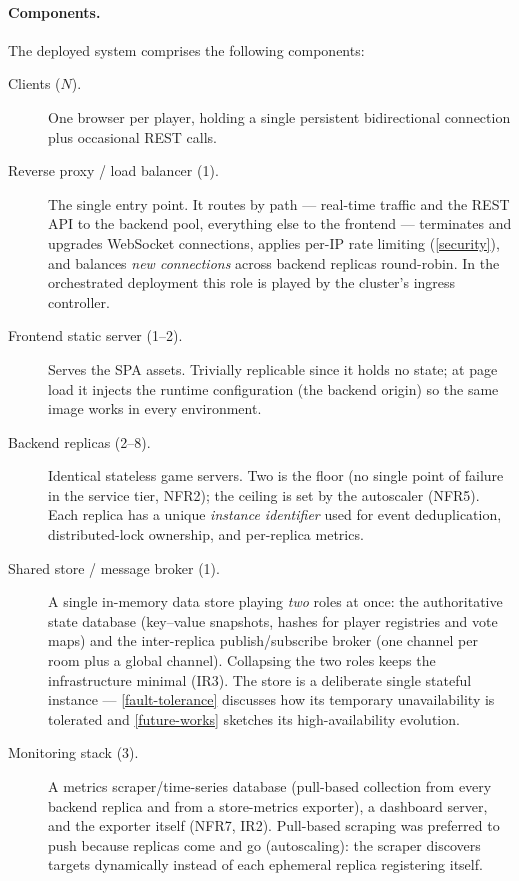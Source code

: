 \documentclass{scrartcl}
\begin{document}
\paragraph{Components.}
The deployed system comprises the following components:
\begin{description}
      \item[Clients ($N$).] One browser per player, holding a single persistent
            bidirectional connection plus occasional REST calls.
      \item[Reverse proxy / load balancer (1).] The single entry point. It routes by
            path --- real-time traffic and the REST API to the backend pool, everything
            else to the frontend --- terminates and upgrades WebSocket connections, applies
            per-IP rate limiting (\cref{security}), and balances \emph{new connections}
            across backend replicas round-robin. In the orchestrated deployment this role
            is played by the cluster's ingress controller.
      \item[Frontend static server (1--2).] Serves the SPA assets. Trivially
            replicable since it holds no state; at page load it injects the runtime
            configuration (the backend origin) so the same image works in every
            environment.
      \item[Backend replicas (2--8).] Identical stateless game servers. Two is the
            floor (no single point of failure in the service tier, NFR2); the ceiling is
            set by the autoscaler (NFR5). Each replica has a unique \emph{instance
                  identifier} used for event deduplication, distributed-lock ownership, and
            per-replica metrics.
      \item[Shared store / message broker (1).] A single in-memory data store
            playing \emph{two} roles at once: the authoritative state database (key--value
            snapshots, hashes for player registries and vote maps) and the inter-replica
            publish/subscribe broker (one channel per room plus a global channel).
            Collapsing the two roles keeps the infrastructure minimal (IR3). The store is a
            deliberate single stateful instance --- \cref{fault-tolerance} discusses how
            its temporary unavailability is tolerated and \cref{future-works} sketches its
            high-availability evolution.
      \item[Monitoring stack (3).] A metrics scraper/time-series database (pull-based
            collection from every backend replica and from a store-metrics exporter), a
            dashboard server, and the exporter itself (NFR7, IR2). Pull-based scraping was
            preferred to push because replicas come and go (autoscaling): the scraper
            discovers targets dynamically instead of each ephemeral replica registering
            itself.
\end{description}
\end{document}
